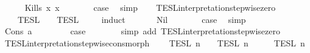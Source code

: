 \begin{isabellebody}
\isanewline
\ \ \ \ \isamarkupfalse%
\ {\isacharparenleft}Kills\ x{}\ x{}{\isacharparenright}\isanewline
\ \ \ \ \isamarkupfalse%
\ \isamarkupfalse%
\ {\isacharquery}case\ \isamarkupfalse%
\ simp\isanewline
\ \ \isamarkupfalse%
%
\endisatagproof
{\isafoldproof}%
%
\isadelimproof
\isanewline
%
\endisadelimproof
\isanewline
{}\isamarkupfalse%
\ TESL{\isacharunderscore}interpretation{\isacharunderscore}stepwise{\isacharunderscore}zero{\isacharprime}{\isacharcolon}\isanewline
\ \ {\isacartoucheopen}{\isasymlbrakk}{\isasymlbrakk}\ {\isasymPhi}\ {\isasymrbrakk}{\isasymrbrakk}\isactrlsub T\isactrlsub E\isactrlsub S\isactrlsub L\ {\isacharequal}\ {\isasymlbrakk}{\isasymlbrakk}\ {\isasymPhi}\ {\isasymrbrakk}{\isasymrbrakk}\isactrlsub T\isactrlsub E\isactrlsub S\isactrlsub L\isactrlbsup {\isasymge}\ {}\isactrlesup {\isacartoucheclose}\isanewline
%
\isadelimproof
\ \ %
\endisadelimproof
%
\isatagproof
{}\isamarkupfalse%
\ {\isacharparenleft}induct\ {\isasymPhi}{\isacharparenright}\isanewline
\ \ \ \ \isamarkupfalse%
\ Nil\isanewline
\ \ \ \ \isamarkupfalse%
\ \isamarkupfalse%
\ {\isacharquery}case\ \isamarkupfalse%
\ simp\isanewline
\ \ \isamarkupfalse%
\isanewline
\ \ \ \ \isamarkupfalse%
\ {\isacharparenleft}Cons\ a\ {\isasymPhi}{\isacharparenright}\isanewline
\ \ \ \ \isamarkupfalse%
\ \isamarkupfalse%
\ {\isacharquery}case\isanewline
\ \ \ \ \ \ \isamarkupfalse%
\ {\isacharparenleft}simp\ add{\isacharcolon}\ TESL{\isacharunderscore}interpretation{\isacharunderscore}stepwise{\isacharunderscore}zero{\isacharparenright}\isanewline
\ \ \isamarkupfalse%
%
\endisatagproof
{\isafoldproof}%
%
\isadelimproof
\isanewline
%
\endisadelimproof
\isanewline
{}\isamarkupfalse%
\ TESL{\isacharunderscore}interpretation{\isacharunderscore}stepwise{\isacharunderscore}cons{\isacharunderscore}morph{\isacharcolon}\isanewline
\ \ {\isacartoucheopen}{\isasymlbrakk}\ {\isasymphi}\ {\isasymrbrakk}\isactrlsub T\isactrlsub E\isactrlsub S\isactrlsub L\isactrlbsup {\isasymge}\ n\isactrlesup \ {\isasyminter}\ {\isasymlbrakk}{\isasymlbrakk}\ {\isasymPhi}\ {\isasymrbrakk}{\isasymrbrakk}\isactrlsub T\isactrlsub E\isactrlsub S\isactrlsub L\isactrlbsup {\isasymge}\ n\isactrlesup \ {\isacharequal}\ {\isasymlbrakk}{\isasymlbrakk}\ {\isasymphi}\ {\isacharhash}\ {\isasymPhi}\ {\isasymrbrakk}{\isasymrbrakk}\isactrlsub T\isactrlsub E\isactrlsub S\isactrlsub L\isactrlbsup {\isasymge}\ n\isactrlesup {\isacartoucheclose}\isanewline

\end{isabellebody}
